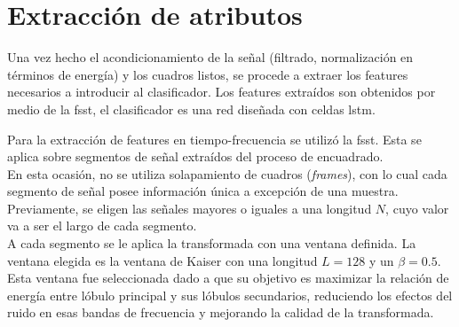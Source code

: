 \section{Extracción de atributos}

\indent Una vez hecho el acondicionamiento de la señal (filtrado, normalización en términos de energía) y los
cuadros listos, se procede a extraer los features necesarios a introducir al clasificador. Los features extraídos
son obtenidos por medio de la \gls{fsst}, el clasificador es una red diseñada con celdas \gls{lstm}. \bigskip

\indent Para la extracción de features en tiempo-frecuencia se utilizó la \gls{fsst}. Esta se aplica sobre
segmentos de señal extraídos del proceso de encuadrado. \\
\indent En esta ocasión, no se utiliza solapamiento de cuadros (\textit{frames}), con lo cual cada segmento de señal
posee información única a excepción de una muestra. Previamente, se eligen las señales mayores o iguales a una
longitud $N$, cuyo valor va a ser el largo de cada segmento. \\
\indent A cada segmento se le aplica la transformada con una ventana definida. La ventana elegida es la ventana de
Kaiser con una longitud $L = 128$ y un $\beta = 0.5$. Esta ventana fue seleccionada dado a que su objetivo es
maximizar la relación de energía entre lóbulo principal y sus lóbulos secundarios, reduciendo los efectos del ruido
en esas bandas de frecuencia y mejorando la calidad de la transformada.

